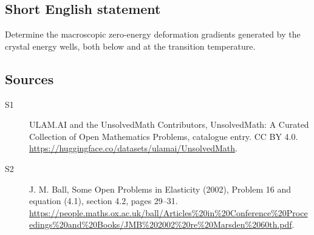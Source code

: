 \documentclass[11pt]{article}
\begin{document}
\subsection{Short English statement}
Determine the macroscopic zero-energy deformation gradients generated by the crystal energy wells, both below and at the transition temperature.
\subsection{Sources}
\begin{description}
\item[\hypertarget{source:statement:1}{S1}] ULAM.AI and the UnsolvedMath Contributors, UnsolvedMath: A Curated Collection of Open Mathematics Problems, catalogue entry. CC BY 4.0. \url{https://huggingface.co/datasets/ulamai/UnsolvedMath}.
\item[\hypertarget{source:statement:2}{S2}] J. M. Ball, Some Open Problems in Elasticity (2002), Problem 16 and equation (4.1), section 4.2, pages 29–31. \url{https://people.maths.ox.ac.uk/ball/Articles%20in%20Conference%20Proceedings%20and%20Books/JMB%202002%20re%20Marsden%2060th.pdf}.
\end{description}
\label{end:statement}
\end{document}
